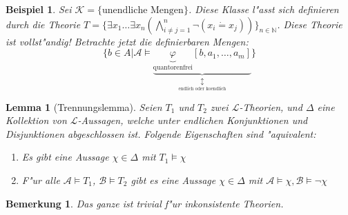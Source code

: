 \documentclass[a4paper,12pt,numbers=noenddot,parskip=full]{scrartcl}
\newcommand{\setN}{\mathbb{N}}
\newcommand{\scrL}{\mathcal{L}}
\newcommand{\scrA}{\mathcal{A}}
\newcommand{\scrB}{\mathcal{B}}
\theoremstyle{dotless}
\newtheorem{lemma}[theorem]{Lemma}
\newtheorem{example}[theorem]{Beispiel}
\newtheorem{remark}[theorem]{Bemerkung}
\begin{document}
\begin{example}
	Sei $\mathcal{K} = \{\text{unendliche Mengen}\}$. Diese Klasse l"asst sich definieren durch die Theorie $T=\{\exists x_1 \dots \exists x_n(\bigwedge\limits^n_{i \neq j =1}\lnot(x_i \dot= x_j))\}_{n \in \setN}$.
	Diese Theorie ist vollst"andig!
	Betrachte jetzt die definierbaren Mengen:
	\begin{equation*}
		\{b \in A | \scrA \models \underbrace{\underbrace{\varphi}_{\text{quantorenfrei}}[b, a_1, \dots, a_m]}_{\underset{\text{endlich oder koendlich}}{\updownarrow}} \}
	\end{equation*}
\end{example}

\begin{lemma}[Trennungslemma]
	Seien $T_1$ und $T_2$ zwei $\scrL$-Theorien, und $\Delta$ eine Kollektion von $\scrL$-Aussagen, welche unter endlichen Konjunktionen und Disjunktionen abgeschlossen ist. Folgende Eigenschaften sind "aquivalent:
	\begin{enumerate}
		\item Es gibt eine Aussage $\chi \in \Delta$ mit $T_1 \models \chi$
		\item F"ur alle $\scrA \models T_1$, $\scrB \models T_2$ gibt es eine Aussage $\chi \in \Delta$ mit $ \scrA \models \chi, \scrB \models \lnot \chi$
	\end{enumerate}
\end{lemma}

\begin{remark}
	Das ganze ist trivial f"ur inkonsistente Theorien.
\end{remark}
\end{document}
